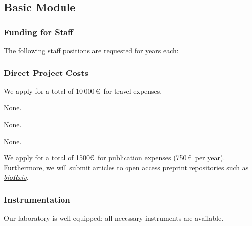 \documentclass{scrartcl}
\begin{document}
\subsection{Basic Module}

\subsubsection{Funding for Staff}
\begin{funds}
The following staff positions are requested for  years each:


\end{funds}


\subsubsection{Direct Project Costs}
\begin{funds}



We apply for a total of 10\,000\,\euro\ for travel expenses.

None.

None.

None.

We apply for a total of 1500\euro\ for publication expenses (750\,\euro\ per
year). Furthermore, we will submit articles to open access preprint repositories
such as \href{https://www.biorxiv.org/}{\textit{bioRxiv}}.

\end{funds}

\subsubsection{Instrumentation}

Our laboratory is well equipped; all necessary instruments are available.
\end{document}
